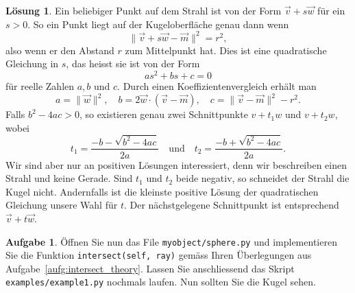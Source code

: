 \documentclass[12pt,a4paper]{article}
\theoremstyle{definition}
\newtheorem{aufgabe}{Aufgabe}
\theoremstyle{definition}
\newtheorem*{losung*}{Lösung}
\begin{document}
	\begin{losung*}
		Ein beliebiger Punkt auf dem Strahl ist von der Form $\vec{v}+s\vec{w}$ für ein $s>0$.
		So ein Punkt liegt auf der Kugeloberfläche genau dann wenn
		\begin{equation*}
			\lVert\vec{v}+s\vec{w}-\vec{m}\rVert^2=r^2,
		\end{equation*}
		also wenn er den Abstand $r$ zum Mittelpunkt hat.
		Dies ist eine quadratische Gleichung in $s$, das heisst sie ist von der Form
		\begin{equation*}
			as^2+bs+c=0
		\end{equation*}
		für reelle Zahlen $a,b$ und $c$.
		Durch einen Koeffizientenvergleich erhält man
		\begin{equation*}
			a=\rVert\vec{w}\rVert^2,\quad
			b=2\vec{w}\cdot(\vec{v}-\vec{m}),\quad
			c=\lVert\vec{v}-\vec{m}\rVert^2-r^2.
		\end{equation*}
		Falls $b^2-4ac>0$, so existieren genau zwei Schnittpunkte $v+t_1w$ und $v+t_2w$, wobei
		\begin{equation*}
			t_1=\frac{-b-\sqrt{b^2-4ac}}{2a}
			\quad\text{und}\quad
			t_2=\frac{-b+\sqrt{b^2-4ac}}{2a}.
		\end{equation*}
		Wir sind aber nur an positiven Lösungen interessiert, denn wir beschreiben einen Strahl und keine Gerade.
		Sind $t_1$ und $t_2$ beide negativ, so schneidet der Strahl die Kugel nicht.
		Andernfalls ist die kleinste positive Lösung der quadratischen Gleichung unsere Wahl für $t$.
		Der nächstgelegene Schnittpunkt ist entsprechend $\vec{v}+t\vec{w}$.
	\end{losung*}
	\begin{aufgabe}\label{aufg:intersect_implementation}
		Öffnen Sie nun das File \texttt{myobject/sphere.py} und implementieren Sie die Funktion \texttt{intersect(self, ray)} gemäss Ihren Überlegungen aus Aufgabe~\ref{aufg:intersect_theory}.
		Lassen Sie anschliessend das Skript \texttt{examples/example1.py} nochmals laufen.
		Nun sollten Sie die Kugel sehen.
	\end{aufgabe}
\end{document}
